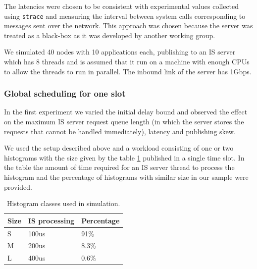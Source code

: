 The latencies were chosen to be consistent with experimental values collected using {\tt strace} and measuring the interval between system calls corresponding to messages sent over the network. This approach was chosen because the server was treated as a black-box as it was developed by another working group. 

We simulated 40 nodes with 10 applications each, publishing to an IS server which has 8 threads and is assumed that it run on a machine with enough CPUs to allow the threads to run in parallel. The inbound link of the server has 1Gbps.

\subsubsection*{Global scheduling for one slot}

In the first experiment we varied the initial delay bound and observed the effect on the maximum IS server request queue length (in which the server stores the requests that cannot be handled immediately), latency and publishing skew. 

We used the setup described above and a workload consisting of one or two histograms with the size given by the table \ref{tab:histosize} published in a single time slot. In the table the amount of time required for an IS server thread to process the histogram and the percentage of histograms with similar size in our sample were provided.

\begin{table}
\centering
\begin{tabular}[ht]{ | l | l | l | }
  \hline                        
  Size & IS processing & Percentage \\
  \hline                        
  S & 100us & 91\% \\
  \hline  
  M & 200us & 8.3\% \\
  \hline  
  L & 400us & 0.6\% \\
  \hline  
\end{tabular}
\caption{Histogram classes used in simulation.}
\label{tab:histosize}
\end{table}

